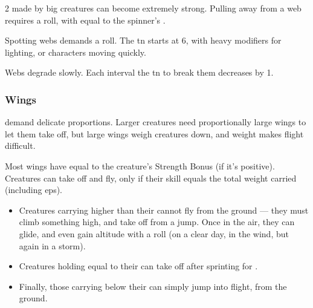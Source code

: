 \begin{multicols}{2}
made by big creatures can become extremely strong.
Pulling away from a web requires a  roll, with  equal to the spinner's .

Spotting webs demands a  roll.
The \gls{tn} starts at 6, with heavy modifiers for lighting, or characters moving quickly.

Webs degrade slowly.
Each \gls{interval} the \gls{tn} to break them decreases by 1.

\medskip

\subsubsection{Wings}
%
demand delicate proportions.
Larger creatures need proportionally large wings to let them take off, but large wings weigh creatures down, and weight makes flight difficult.

Most wings have  equal to the creature's Strength Bonus (if it's positive).
Creatures can take off and fly, only if their  \gls{skill} equals the total \gls{weight} carried (including \glspl{ep}).

\begin{itemize}
  \item
  Creatures carrying  higher than their  cannot fly from the ground --- they must climb something high, and take off from a jump.
  Once in the air, they can glide, and even gain altitude with a  roll (\tn[10] on a clear day, \tn[7] in the wind, but \tn[10] again in a storm).
  \item
  Creatures holding  equal to their  can take off after sprinting for .
  \item
  Finally, those carrying  below their  can simply jump into flight, from the ground.
\end{itemize}


\end{multicols}
